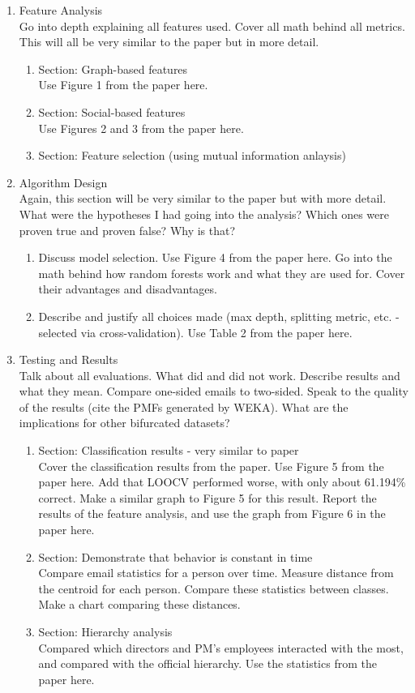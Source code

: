 \documentclass[12pt,dvips]{report}
\begin{document}
\begin{enumerate}
\item Feature Analysis\\
Go into depth explaining all features used.  Cover all math behind all metrics.  This will all be very similar to the paper but in more detail.
\begin{enumerate}
\item Section: Graph-based features\\
Use Figure 1 from the paper here.
\item Section: Social-based features\\
Use Figures 2 and 3 from the paper here.
\item Section: Feature selection (using mutual information anlaysis)
\end{enumerate}

\item Algorithm Design\\
Again, this section will be very similar to the paper but with more detail.  What were the hypotheses I had going into the analysis?  Which ones were proven true and proven false?  Why is that?
\begin{enumerate}
\item Discuss model selection.  Use Figure 4 from the paper here.  Go into the math behind how random forests work and what they are used for.  Cover their advantages and disadvantages.  
\item Describe and justify all choices made (max depth, splitting metric, etc. - selected via cross-validation).  Use Table 2 from the paper here.
\end{enumerate}

\item Testing and Results \\
Talk about all evaluations.  What did and did not work.  Describe results and what they mean.  Compare one-sided emails to two-sided.  Speak to the quality of the results (cite the PMFs generated by WEKA).  What are the implications for other bifurcated datasets?
\begin{enumerate}
\item Section: Classification results - very similar to paper\\
Cover the classification results from the paper.  Use Figure 5 from the paper here.  Add that LOOCV performed worse, with only about 61.194\% correct.  Make a similar graph to Figure 5 for this result.  Report the results of the feature analysis, and use the graph from Figure 6 in the paper here.
\item Section: Demonstrate that behavior is constant in time\\
Compare email statistics for a person over time.  Measure distance from the centroid for each person.  Compare these statistics between classes.  Make a chart comparing these distances.
\item Section: Hierarchy analysis\\
Compared which directors and PM's employees interacted with the most, and compared with the official hierarchy.  Use the statistics from the paper here.


\end{enumerate}
\end{enumerate}
\end{document}
